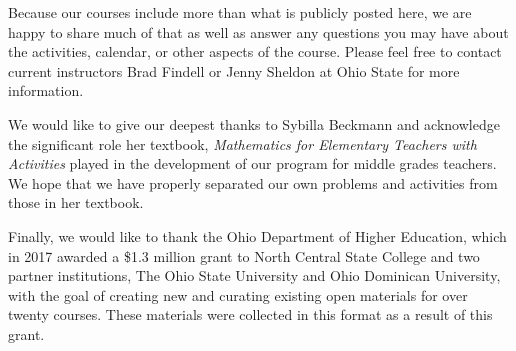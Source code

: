 \documentclass[nooutcomes]{ximera}
\begin{document}
Because our courses include more than what is publicly posted here, we are happy to share much of 
that as well as answer any questions you may have about the activities, calendar, or other aspects of the course.  Please feel free to contact current instructors Brad Findell or Jenny Sheldon at Ohio State for more information.

We would like to give our deepest thanks to Sybilla Beckmann and acknowledge the significant role her textbook, \emph{Mathematics for Elementary Teachers with Activities} played in the development of our program for middle grades teachers.  We hope that we have properly separated our own problems and activities from those in her textbook. 

Finally, we would like to thank the Ohio Department of Higher Education, which in 2017 awarded a \$1.3 million grant to North Central State College and two partner institutions, The Ohio State University and Ohio Dominican University, with the goal of creating new and curating existing open materials for over twenty courses.  These materials were collected in this format as a result of this grant.
\end{document}
